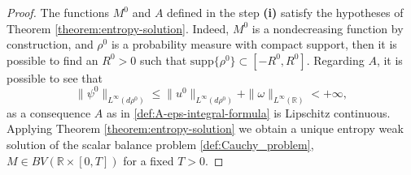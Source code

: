 \documentclass[11pt,a4paper,oneside]{amsart}
\newcommand\R{\mathbb{R}}
\newcommand{\supp}{\text{supp}}
\begin{document}
\begin{proof}
The functions $M^0$ and $A$ defined in the step \textbf{(i)} satisfy the hypotheses of Theorem \ref{theorem:entropy-solution}.
Indeed, $M^0$ is a nondecreasing function  by construction, and $\rho^0$ is a probability measure with compact support, 
then it is possible to find an $R^0>0$ such that $\supp \{\rho^0\}\subset[-R^0,R^0]$. Regarding $A$, it is possible to see that
    $$
    \|\psi^0\|_{L^\infty(d\rho^0)} \leq \|u^0\|_{L^\infty(d\rho^0)}+\|\omega\|_{L^\infty(\R)}<+\infty,
    $$
as a consequence $A$ as in \eqref{def:A-eps-integral-formula} is Lipschitz continuous. 
Applying Theorem \ref{theorem:entropy-solution} we obtain a unique entropy weak solution 
of the scalar balance problem \eqref{def:Cauchy_problem}, $M\in BV(\R\times[0,T])$ for a fixed $T>0$. 


\end{proof}
\end{document}
